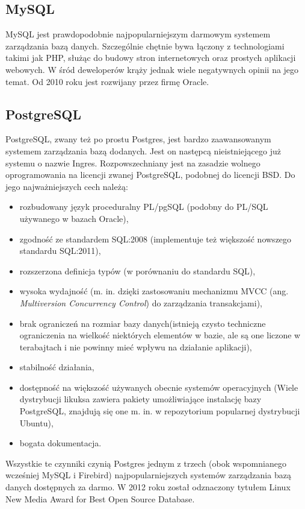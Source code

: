 \subsection[MySQL][MySQL]{MySQL} 
MySQL jest prawdopodobnie najpopularniejszym darmowym systemem zarządzania bazą danych. Szczególnie chętnie bywa łączony z technologiami takimi jak PHP, służąc do budowy stron internetowych oraz prostych aplikacji webowych. W śród deweloperów krąży jednak wiele negatywnych opinii na jego temat. Od 2010 roku jest rozwijany przez firmę Oracle.

\subsection[PostgreSQL][PostgreSQL]{PostgreSQL} 
PostgreSQL, zwany też po prostu Postgres, jest bardzo zaawansowanym systemem zarządzania bazą dodanych. Jest on następcą nieistniejącego już systemu o nazwie Ingres. Rozpowszechniany jest na zasadzie wolnego oprogramowania na licencji zwanej PostgreSQL, podobnej do licencji BSD. Do jego najważniejszych cech należą:
\begin{itemize}
	\item rozbudowany język proceduralny PL/pgSQL (podobny do PL/SQL używanego w bazach Oracle),
	\item zgodność ze standardem SQL:2008 (implementuje też większość nowszego standardu SQL:2011),
	\item rozszerzona definicja typów (w porównaniu do standardu SQL),
	\item wysoka wydajność (m. in. dzięki zastosowaniu mechanizmu MVCC (ang. \textit{Multiversion Concurrency Control}) do zarządzania transakcjami),
	\item brak ograniczeń na rozmiar bazy danych(istnieją czysto techniczne ograniczenia na wielkość niektórych elementów w bazie, ale są one liczone w terabajtach i nie powinny mieć wpływu na działanie aplikacji),
	\item stabilność działania,
	\item dostępność na większość używanych obecnie systemów operacyjnych (Wiele dystrybucji likuksa zawiera pakiety umożliwiające instalację bazy PostgreSQL, znajdują się one m. in. w repozytorium popularnej dystrybucji Ubuntu),
	\item bogata dokumentacja.
\end{itemize}
Wszystkie te czynniki czynią Postgres jednym z trzech (obok wspomnianego wcześniej MySQL i Firebird) najpopularniejszych systemów zarządzania bazą danych dostępnych za darmo. W 2012 roku został odznaczony tytułem Linux New Media Award for Best Open Source Database.

